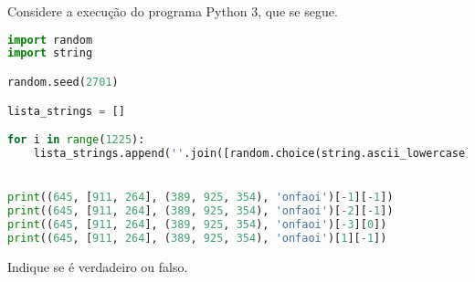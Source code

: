 \documentclass[12pt,varwidth=16cm,border=17pt]{standalone}
\begin{document}
Considere a execução do programa Python 3, que se segue. 

\begin{lstlisting}[language=Python]
import random
import string

random.seed(2701)

lista_strings = []

for i in range(1225):
	lista_strings.append(''.join([random.choice(string.ascii_lowercase) for i in range(7)]))


print((645, [911, 264], (389, 925, 354), 'onfaoi')[-1][-1])
print((645, [911, 264], (389, 925, 354), 'onfaoi')[-2][-1])
print((645, [911, 264], (389, 925, 354), 'onfaoi')[-3][0])
print((645, [911, 264], (389, 925, 354), 'onfaoi')[1][-1])
\end{lstlisting}

Indique se é verdadeiro ou falso.
\end{document}
